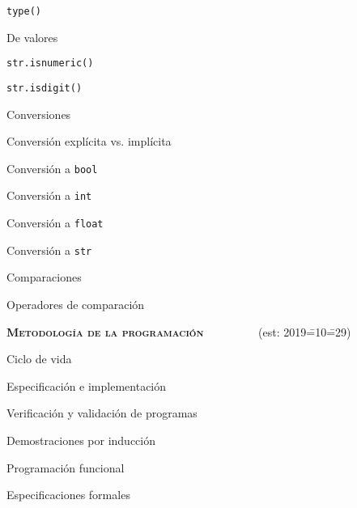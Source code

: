 \begin{longenum}
\begin{longenum}
\begin{longenum}
\begin{longenum}
\begin{longenum}
                    \item \texttt{type()}
                \end{longenum}
                \item De valores
                \begin{longenum}
                    \item \texttt{str.isnumeric()}
                    \item \texttt{str.isdigit()}
                \end{longenum}
            \end{longenum}
            \item Conversiones
            \begin{longenum}
                \item Conversión explícita vs. implícita
                \item Conversión a \texttt{bool}
                \item Conversión a \texttt{int}
                \item Conversión a \texttt{float}
                \item Conversión a \texttt{str}
            \end{longenum}
            \item Comparaciones
            \begin{longenum}
                \item Operadores de comparación
            \end{longenum}
        \end{longenum}
    \end{longenum}
    \item \textbf{\textsc{Metodología de la programación}} \ \ \ \ \ \ \ \ \ (est: 2019\==10\==29)
    \begin{longenum}
        \item Ciclo de vida
        \item Especificación e implementación
        \item Verificación y validación de programas
        \begin{longenum}
            \item Demostraciones por inducción
        \end{longenum}
        \item Programación funcional
        \begin{longenum}
            \item Especificaciones formales

\end{longenum}
\end{longenum}
\end{longenum}
